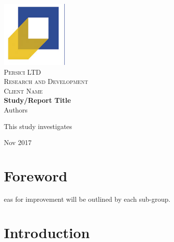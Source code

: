 \documentclass{article}
\numberwithin{equation}{subsection}
\numberwithin{figure}{section}
\begin{document}
\begin{titlepage}
\thispagestyle{empty}
    \begin{center}
    \includegraphics[width=0.25\textwidth]{logo}~\\[1.5cm]
    \textsc{\LARGE Persici LTD}\\[0.5cm]
    \textsc{\LARGE Research and Development}\\[1.5cm]
    \textsc{\Large Client Name}\\[1.0cm]
    { \LARGE \bfseries Study/Report Title \\[1.0cm] }
    Authors\\[1.5cm]
    \end{center}

    \textnormal{This study investigates }
    
    \begin{center}
    \vfill
    {\large Nov 2017}
    \end{center}
\end{titlepage}



\pagestyle{fancy}

\section*{Foreword}
eas for improvement will be outlined by each sub-group. 

\tableofcontents

\newpage
{}
\section{Introduction}
\end{document}
